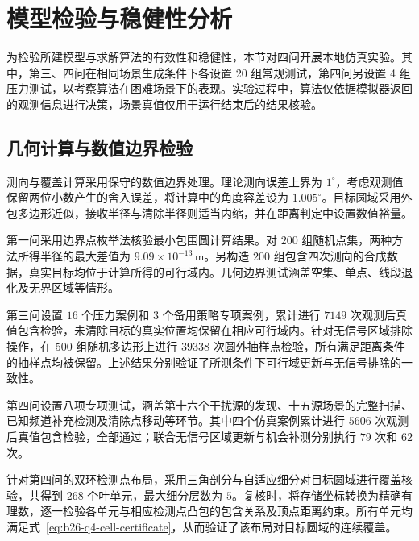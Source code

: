 \documentclass[withoutpreface,bwprint]{cumcmthesis} %
\begin{document}
\section{模型检验与稳健性分析}
为检验所建模型与求解算法的有效性和稳健性，本节对四问开展本地仿真实验。其中，第三、四问在相同场景生成条件下各设置 20 组常规测试，第四问另设置 4 组压力测试，以考察算法在困难场景下的表现。实验过程中，算法仅依据模拟器返回的观测信息进行决策，场景真值仅用于运行结束后的结果核验。

\subsection{几何计算与数值边界检验}
测向与覆盖计算采用保守的数值边界处理。理论测向误差上界为 \(1^\circ\)，考虑观测值保留两位小数产生的舍入误差，将计算中的角度容差设为 \(1.005^\circ\)。目标圆域采用外包多边形近似，接收半径与清除半径则适当内缩，并在距离判定中设置数值裕量。

第一问采用边界点枚举法核验最小包围圆计算结果。对 \(200\) 组随机点集，两种方法所得半径的最大差值为 \(9.09\times10^{-13}\,\mathrm m\)。另构造 \(200\) 组包含四次测向的合成数据，真实目标均位于计算所得的可行域内。几何边界测试涵盖空集、单点、线段退化及无界区域等情形。

第三问设置 \(16\) 个压力案例和 \(3\) 个备用策略专项案例，累计进行 \(7149\) 次观测后真值包含检验，未清除目标的真实位置均保留在相应可行域内。针对无信号区域排除操作，在 \(500\) 组随机多边形上进行 \(39338\) 次圆外抽样点检验，所有满足距离条件的抽样点均被保留。上述结果分别验证了所测条件下可行域更新与无信号排除的一致性。

第四问设置八项专项测试，涵盖第十六个干扰源的发现、十五源场景的完整扫描、已知频道补充检测及清除点移动等环节。其中四个仿真案例累计进行 \(5606\) 次观测后真值包含检验，全部通过；联合无信号区域更新与机会补测分别执行 \(79\) 次和 \(62\) 次。

针对第四问的双环检测点布局，采用三角剖分与自适应细分对目标圆域进行覆盖核验，共得到 \(268\) 个叶单元，最大细分层数为 \(5\)。复核时，将存储坐标转换为精确有理数，逐一检验各单元与相应检测点凸包的包含关系及顶点距离约束。所有单元均满足式~\eqref{eq:b26-q4-cell-certificate}，从而验证了该布局对目标圆域的连续覆盖。
\end{document}
